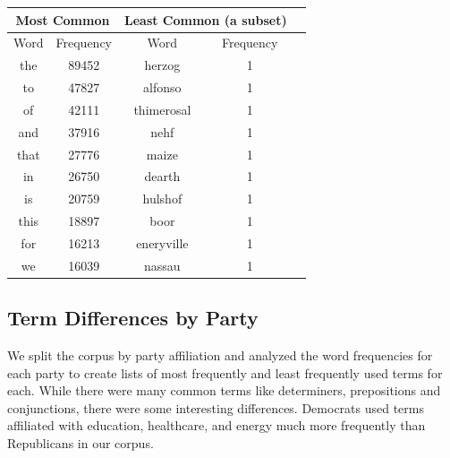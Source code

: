 \documentclass[a4paper, 12pt]{article}
\begin{document}
\noindent

\begin{table}[h]
\centering
\label{Most and Least Common Words}
\begin{tabular}{|c|c|c|c|c|}
\multicolumn{2}{c}{Most Common} & \multicolumn{2}{l}{Least Common (a subset)} \\
\hline
Word                 & Frequency        &  Word & Frequency      \\
\hline
the                  & 89452                & herzog &1\\
to                  & 47827                 &   alfonso &1\\
of                    & 42111                  & thimerosal&1\\
and                   & 37916                    & nehf&1\\
that            & 27776                   & maize&1\\
in                   & 26750                   & dearth&1\\
is                   & 20759                   &hulshof&1\\
this                    & 18897                   & boor&1\\
for                   & 16213                    &eneryville& 1\\
we                & 16039                 & nassau & 1 \\
\hline
\end{tabular}
\end{table}
\noindent
\subsection{Term Differences by Party}
We split the corpus by party affiliation and analyzed the word frequencies for each party to create lists of most frequently and least frequently used terms for each. While there were many common terms like determiners, prepositions and conjunctions, there were some interesting differences. Democrats used terms affiliated with education, healthcare, and energy much more frequently than Republicans in our corpus. 

\end{document}
